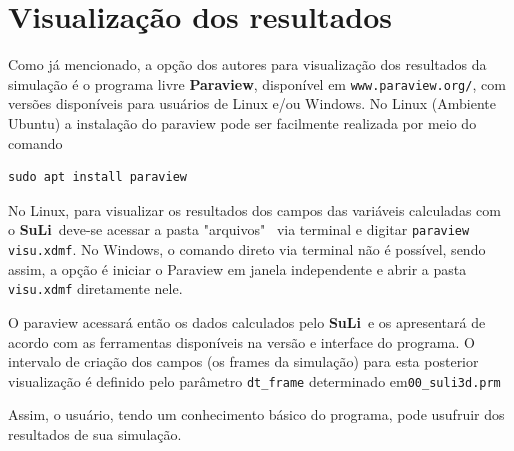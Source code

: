 \documentclass[12pt, a4paper]{article}
\newcommand{\SL}{{\bf SuLi}}
\begin{document}
\newpage


\section{Visualização dos resultados}	\label{visu}
Como já mencionado, a opção dos autores para visualização dos resultados da simulação é o programa livre \textbf{Paraview}, disponível em \verb|www.paraview.org/|, com versões disponíveis para usuários de Linux e/ou Windows. No Linux (Ambiente Ubuntu) a instalação do paraview pode ser facilmente realizada por meio do comando 

\begin{verbatim}
sudo apt install paraview
\end{verbatim}

No Linux, para visualizar os resultados dos campos das variáveis calculadas com o \SL\ deve-se acessar a pasta "arquivos" \, via terminal e digitar \verb|paraview visu.xdmf|. No Windows, o comando direto via terminal não é possível, sendo assim, a opção é iniciar o Paraview em janela independente e abrir a pasta \verb|visu.xdmf| diretamente nele.



O paraview acessará então os dados calculados pelo \SL\ e os apresentará de acordo com as ferramentas disponíveis na versão e interface do programa. O intervalo de criação dos campos (os frames da simulação) para esta posterior visualização é definido pelo parâmetro \verb|dt_frame| determinado em\verb|00_suli3d.prm|

Assim, o usuário, tendo um conhecimento básico do programa, pode usufruir dos resultados de sua simulação.

\newpage

\end{document}
